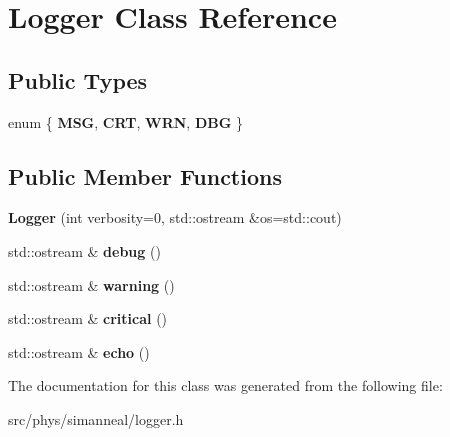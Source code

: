 \hypertarget{classLogger}{}\section{Logger Class Reference}
\label{classLogger}
\subsection*{Public Types}
\begin{DoxyCompactItemize}
\item 
enum \{ {\bfseries M\+SG}, 
{\bfseries C\+RT}, 
{\bfseries W\+RN}, 
{\bfseries D\+BG}
 \}\hypertarget{classLogger_a737161d132f5296b6a6a387e702343ac}{}\label{classLogger_a737161d132f5296b6a6a387e702343ac}

\end{DoxyCompactItemize}
\subsection*{Public Member Functions}
\begin{DoxyCompactItemize}
\item 
{\bfseries Logger} (int verbosity=0, std\+::ostream \&os=std\+::cout)\hypertarget{classLogger_a3099b53a40ad6e4f5810f560da0d6c90}{}\label{classLogger_a3099b53a40ad6e4f5810f560da0d6c90}

\item 
std\+::ostream \& {\bfseries debug} ()\hypertarget{classLogger_a70b44651d1e425ca46580b55ad1f30a7}{}\label{classLogger_a70b44651d1e425ca46580b55ad1f30a7}

\item 
std\+::ostream \& {\bfseries warning} ()\hypertarget{classLogger_ab8c57d3919006540ba76a478014830ce}{}\label{classLogger_ab8c57d3919006540ba76a478014830ce}

\item 
std\+::ostream \& {\bfseries critical} ()\hypertarget{classLogger_a34f21a2dd75630ef8321eac700afdf83}{}\label{classLogger_a34f21a2dd75630ef8321eac700afdf83}

\item 
std\+::ostream \& {\bfseries echo} ()\hypertarget{classLogger_ac9236d1e705cb21f8c169d97d87a2bab}{}\label{classLogger_ac9236d1e705cb21f8c169d97d87a2bab}

\end{DoxyCompactItemize}


The documentation for this class was generated from the following file\+:\begin{DoxyCompactItemize}
\item 
src/phys/simanneal/logger.\+h\end{DoxyCompactItemize}
